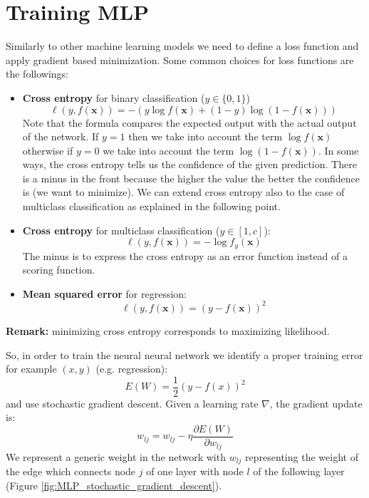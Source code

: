 \section{Training MLP}
Similarly to other machine learning models we need to define a loss function and
apply gradient based minimization. Some common choices for loss functions are
the followings:
\begin{itemize}
	\item \textbf{Cross entropy} for binary classification ($y \in \{0,1\}$)
		\begin{equation}
			\ell(y,f(\pmb{x})) = -(y \log{f(\pmb{x})}+ (1-y)\log{(1-f(\pmb{x}))})
		\end{equation}
		Note that the formula compares the expected output with the actual output of
		the network. If $y=1$ then we take into account the term $\log{f(\pmb{x})}$ otherwise
		if $y=0$ we take into account the term $\log{(1-f(\pmb{x}))}$. In some ways,
		the cross entropy tells us the confidence of the given prediction. There is
		a minus in the front because the higher the value the better the confidence
		is (we want to minimize). We can extend cross entropy also to
		the case of multiclass classification as explained in the following point.

	\item \textbf{Cross entropy} for multiclass classification ($y \in [1,c]$):
		\begin{equation}
			\ell(y, f(\pmb{x})) = -\log{f_y(\pmb{x})}
		\end{equation}
		The minus is to express the cross entropy as an error function instead of a scoring
		function.

	\item \textbf{Mean squared error} for regression:
		\begin{equation}
			\ell(y, f(\pmb{x})) = (y-f(\pmb{x}))^{2}
		\end{equation}
\end{itemize}
\textbf{Remark:} minimizing cross entropy corresponds to maximizing likelihood.
\newline

So, in order to train the neural neural network we identify a proper training error
for example $(x,y)$ (e.g. regression):
\begin{equation}
	E(W) = \frac{1}{2}(y - f(x))^{2}
\end{equation}
and use stochastic gradient descent. Given a learning rate $\nabla$, the gradient
update is:
\begin{equation}
	w_{lj}= w_{lj}- \eta \frac{\partial E(W)}{\partial w_{lj}}
\end{equation}
We represent a generic weight in the network with $w_{lj}$ representing the
weight of the edge which connects node $j$ of one layer with node $l$ of the
following layer (Figure \ref{fig:MLP_stochastic_gradient_descent}).

